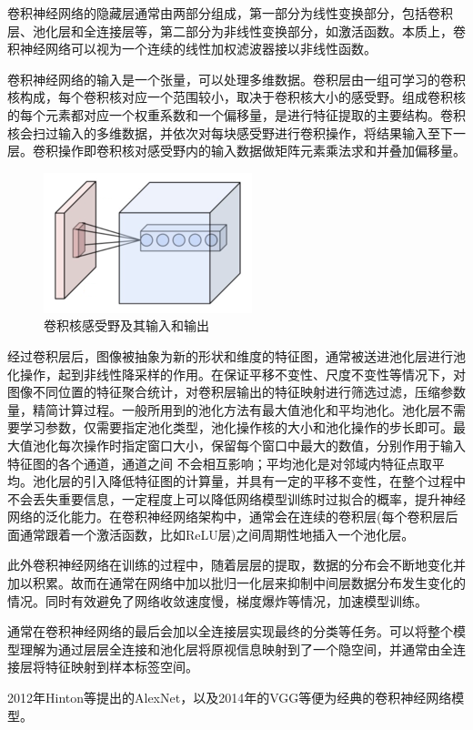 卷积神经网络的隐藏层通常由两部分组成，第一部分为线性变换部分，包括卷积层、池化层和全连接层等，第二部分为非线性变换部分，如激活函数。本质上，卷积神经网络可以视为一个连续的线性加权滤波器接以非线性函数。

卷积神经网络的输入是一个张量，可以处理多维数据。卷积层由一组可学习的卷积核构成，每个卷积核对应一个范围较小，取决于卷积核大小的感受野。组成卷积核的每个元素都对应一个权重系数和一个偏移量，是进行特征提取的主要结构。卷积核会扫过输入的多维数据，并依次对每块感受野进行卷积操作，将结果输入至下一层。卷积操作即卷积核对感受野内的输入数据做矩阵元素乘法求和并叠加偏移量。

\begin{figure}[h]
	\centering
	\includegraphics[scale=1.2]{figures/8.png}
	\caption{卷积核感受野及其输入和输出}
	\label{fig:f8}
\end{figure}
经过卷积层后，图像被抽象为新的形状和维度的特征图，通常被送进池化层进行池化操作，起到非线性降采样的作用。在保证平移不变性、尺度不变性等情况下，对图像不同位置的特征聚合统计，对卷积层输出的特征映射进行筛选过滤，压缩参数量，精简计算过程。一般所用到的池化方法有最大值池化和平均池化。池化层不需要学习参数，仅需要指定池化类型，池化操作核的大小和池化操作的步长即可。最大值池化每次操作时指定窗口大小，保留每个窗口中最大的数值，分别作用于输入特征图的各个通道，通道之间 不会相互影响；平均池化是对邻域内特征点取平均。池化层的引入降低特征图的计算量，并具有一定的平移不变性，在整个过程中不会丢失重要信息，一定程度上可以降低网络模型训练时过拟合的概率，提升神经网络的泛化能力。在卷积神经网络架构中，通常会在连续的卷积层(每个卷积层后面通常跟着一个激活函数，比如ReLU层)之间周期性地插入一个池化层。

此外卷积神经网络在训练的过程中，随着层层的提取，数据的分布会不断地变化并加以积累。故而在通常在网络中加以批归一化层来抑制中间层数据分布发生变化的情况。同时有效避免了网络收敛速度慢，梯度爆炸等情况，加速模型训练。

通常在卷积神经网络的最后会加以全连接层实现最终的分类等任务。可以将整个模型理解为通过层层全连接和池化层将原视信息映射到了一个隐空间，并通常由全连接层将特征映射到样本标签空间。

2012年Hinton等提出的AlexNet，以及2014年的VGG等便为经典的卷积神经网络模型。



